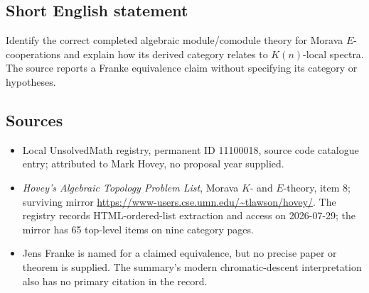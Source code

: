 \documentclass[11pt]{article}
\begin{document}
\subsection{Short English statement}
Identify the correct completed algebraic module/comodule theory for Morava $E$-cooperations and explain how its derived category relates to $K(n)$-local spectra. The source reports a Franke equivalence claim without specifying its category or hypotheses.
\subsection{Sources}
\begin{itemize}
\item Local UnsolvedMath registry, permanent ID 11100018, source code catalogue entry; attributed to Mark Hovey, no proposal year supplied.
\item \emph{Hovey's Algebraic Topology Problem List}, Morava $K$- and $E$-theory, item 8; surviving mirror \url{https://www-users.cse.umn.edu/~tlawson/hovey/}. The registry records HTML-ordered-list extraction and access on 2026-07-29; the mirror has 65 top-level items on nine category pages.
\item Jens Franke is named for a claimed equivalence, but no precise paper or theorem is supplied. The summary's modern chromatic-descent interpretation also has no primary citation in the record.
\end{itemize}
\end{document}
